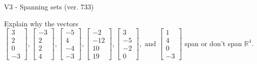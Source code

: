 \begin{exercise}
  \begin{exerciseTitle}V3 - Spanning sets (ver. 733)\end{exerciseTitle}
  \begin{exerciseStatement}
    Explain why the vectors \(\left[\begin{array}{r}
3 \\
2 \\
0 \\
-3
\end{array}\right] , \left[\begin{array}{r}
-3 \\
2 \\
2 \\
4
\end{array}\right] , \left[\begin{array}{r}
-5 \\
4 \\
-4 \\
-3
\end{array}\right] , \left[\begin{array}{r}
-2 \\
-12 \\
10 \\
19
\end{array}\right] , \left[\begin{array}{r}
3 \\
-5 \\
-2 \\
0
\end{array}\right] , \text{ and } \left[\begin{array}{r}
1 \\
4 \\
0 \\
-3
\end{array}\right]\) span or don't span \(\mathbb{R}^4\). 
	



\end{exerciseStatement}
\end{exercise}
